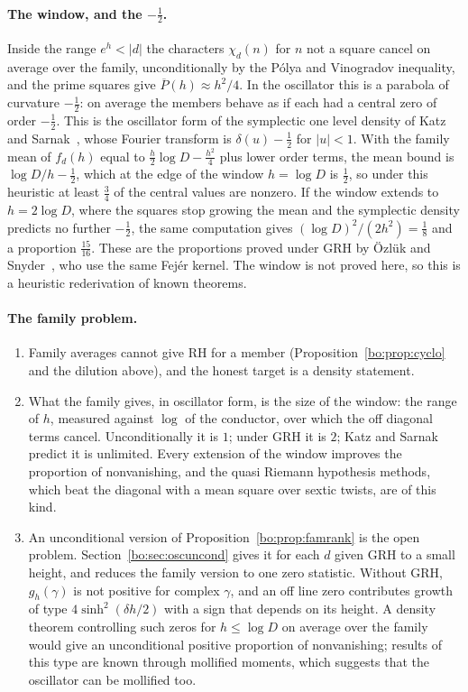 \paragraph{The window, and the $-\frac12$.} Inside the range $e^h<|d|$ the characters $\chi_d(n)$ for $n$ not a square cancel on average over the family, unconditionally by the P\'olya and Vinogradov inequality, and the prime squares give $\overline{P}(h)\approx h^2/4$. In the oscillator this is a parabola of curvature $-\frac12$: on average the members behave as if each had a central zero of order $-\frac12$. This is the oscillator form of the symplectic one level density of Katz and Sarnak~\cite{KatzSarnak99}, whose Fourier transform is $\delta(u)-\frac12$ for $|u|<1$. With the family mean of $f_d(h)$ equal to $\frac h2\log D-\frac{h^2}4$ plus lower order terms, the mean bound is $\log D/h-\frac12$, which at the edge of the window $h=\log D$ is $\frac12$, so under this heuristic at least $\frac34$ of the central values are nonzero. If the window extends to $h=2\log D$, where the squares stop growing the mean and the symplectic density predicts no further $-\frac12$, the same computation gives $(\log D)^2/(2h^2)=\frac18$ and a proportion $\frac{15}{16}$. These are the proportions proved under GRH by \"Ozl\"uk and Snyder~\cite{OzlukSnyder99}, who use the same Fej\'er kernel. The window is not proved here, so this is a heuristic rederivation of known theorems.

\paragraph{The family problem.}
\begin{enumerate}
\item Family averages cannot give RH for a member (Proposition~\ref{bo:prop:cyclo} and the dilution above), and the honest target is a density statement.
\item What the family gives, in oscillator form, is the size of the window: the range of $h$, measured against $\log$ of the conductor, over which the off diagonal terms cancel. Unconditionally it is $1$; under GRH it is $2$; Katz and Sarnak predict it is unlimited. Every extension of the window improves the proportion of nonvanishing, and the quasi Riemann hypothesis methods, which beat the diagonal with a mean square over sextic twists, are of this kind.
\item An unconditional version of Proposition~\ref{bo:prop:famrank} is the open problem. Section~\ref{bo:sec:oscuncond} gives it for each $d$ given GRH to a small height, and reduces the family version to one zero statistic. Without GRH, $g_h(\gamma)$ is not positive for complex $\gamma$, and an off line zero contributes growth of type $4\sinh^2(\delta h/2)$ with a sign that depends on its height. A density theorem controlling such zeros for $h\le\log D$ on average over the family would give an unconditional positive proportion of nonvanishing; results of this type are known through mollified moments, which suggests that the oscillator can be mollified too.
\end{enumerate}

